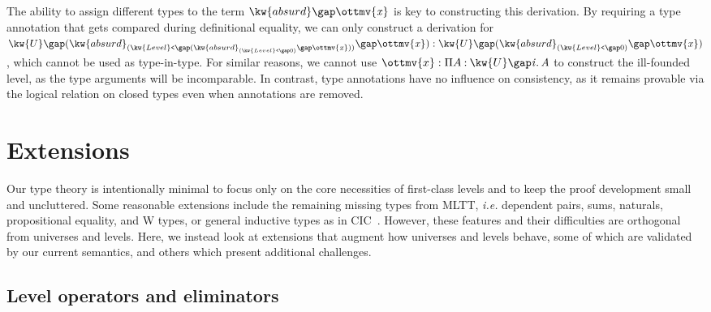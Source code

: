 \documentclass[a4paper,UKenglish,cleveref,autoref,thm-restate]{lipics-v2021}
\makeatletter
\newcommand{\citep}[1]{\cite{#1}}
\newcommand{\ie}{\textit{i.e.}\@\xspace}
\makeatother
\begin{document}
The ability to assign different types to the term $ \kw{absurd} \gap   \mathit{ \ottmv{x} }  $ is key to constructing this derivation.
By requiring a type annotation that gets compared during definitional equality,
we can only construct a derivation for
$ \kw{U} \gap   (  \kw{absurd}_{  (  \kw{Level}\texttt{<} \gap   (  \kw{absurd}_{  (  \kw{Level}\texttt{<} \gap   0   )  } \gap   \mathit{ \ottmv{x} }   )   )  } \gap   \mathit{ \ottmv{x} }   )   :  \kw{U} \gap   (  \kw{absurd}_{  (  \kw{Level}\texttt{<} \gap   0   )  } \gap   \mathit{ \ottmv{x} }   )  $,
which cannot be used as type-in-type.
For similar reasons, we cannot use $\ottmv{x} :  \Pi  A  \mathbin{:}   \kw{U} \gap   \mathit{ i }    \mathpunct{.}   \mathit{ A }  $
to construct the ill-founded level, as the type arguments will be incomparable.
In contrast, type annotations have no influence on consistency,
as it remains provable via the logical relation on closed types
even when annotations are removed.

\section{Extensions} \label{sec:extensions}

Our type theory is intentionally minimal to focus only on the core necessities
of first-class levels and to keep the proof development small and uncluttered.
Some reasonable extensions include the remaining missing types from MLTT,
\ie dependent pairs, sums, naturals, propositional equality, and W types,
or general inductive types as in CIC~\citep{pcuic}.
However, these features and their difficulties are orthogonal from universes and levels.
Here, we instead look at extensions that augment how universes and levels behave,
some of which are validated by our current semantics,
and others which present additional challenges.

\subsection{Level operators and eliminators}
\end{document}
